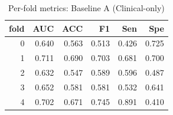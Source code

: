 \begin{table}[H]
\centering
\small
\caption{Per-fold metrics: Baseline A (Clinical-only)}
\label{tab:baseline_a_clinical_only_per_fold}
\begin{tabular}{rrrrrr}
\toprule
fold & AUC & ACC & F1 & Sen & Spe \\
\midrule
0 & 0.640 & 0.563 & 0.513 & 0.426 & 0.725 \\
1 & 0.711 & 0.690 & 0.703 & 0.681 & 0.700 \\
2 & 0.632 & 0.547 & 0.589 & 0.596 & 0.487 \\
3 & 0.652 & 0.581 & 0.581 & 0.532 & 0.641 \\
4 & 0.702 & 0.671 & 0.745 & 0.891 & 0.410 \\
\bottomrule
\end{tabular}
\end{table}
